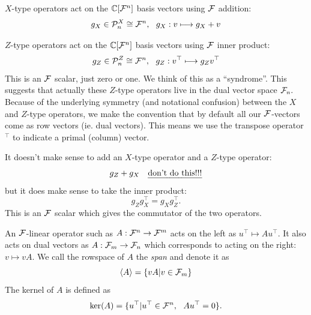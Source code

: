 $X$-type operators act on the $\mathbb{C}[\mathcal{F}^n]$
basis vectors using $\mathcal{F}$ addition:
$$
    g_X \in \mathcal{P}^X_n \cong \mathcal{F}^n, \ \ g_X : v \longmapsto g_X + v
$$

$Z$-type operators act on the
$\mathbb{C}[\mathcal{F}^n]$ basis vectors using $\mathcal{F}$ inner product:
$$
    g_Z \in \Pauli^Z_n \cong \Fn, \ \ g_Z : v^\top \longmapsto g_Z v^\top
$$
This is an $\mathcal{F}$ scalar, just zero or one. We think of this
as a ``syndrome''.
This suggests that actually these $Z$-type operators
live in the dual vector space $\mathcal{F}_{n}.$
Because of the underlying symmetry
(and notational confusion)
between the $X$ and $Z$-type operators,
we make the convention that by default
all our $\mathcal{F}$-vectors come as row vectors (ie. dual vectors).
This means we use the transpose operator $^\top$ to
indicate a primal (column) vector.

It doesn't make sense to add an $X$-type operator and
a $Z$-type operator:
$$
    g_Z + g_X \ \ \ \mbox{\emph{don't do this!!!}}
$$
but it does make sense to take the inner product:
$$
    g_Z g_X^\top = g_X g_Z^\top.
$$
This is an $\mathcal{F}$ scalar which gives the commutator of the 
two operators.

An $\mathcal{F}$-linear operator such as
$ A : \mathcal{F}^n \to \mathcal{F}^m $
acts on the left as $ u^\top \mapsto A u^\top.$
It also acts on dual vectors as
$ A : \mathcal{F}_{m} \to \mathcal{F}_{n} $
which corresponds to acting on the right: $v \mapsto vA.$ 
We call the rowspace of 
$A$ the \emph{span} and denote 
it as 
$$\langle A \rangle = \{ vA | v \in \mathcal{F}_{m} \}$$
The kernel of $A$ is defined as
$$
    \mathrm{ker}(A) = \{ u^\top | u^\top \in \mathcal{F}^n,\ \  A u^\top = 0 \}.
$$

